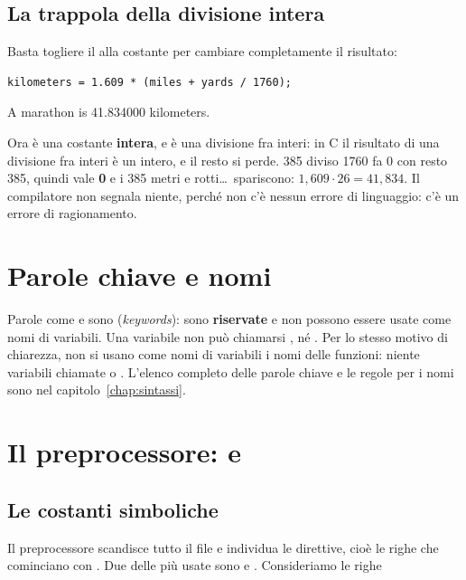 \subsection{La trappola della divisione intera}

Basta togliere il  alla costante per cambiare completamente il
risultato:

\begin{affianco}[0.6][c]
\begin{lstlisting}[style=c]
kilometers = 1.609 * (miles + yards / 1760);
\end{lstlisting}
\risultato
\begin{console}
A marathon is 41.834000 kilometers.
\end{console}
\end{affianco}

Ora  è una costante \textbf{intera}, e  è
una divisione fra interi: in C il risultato di una divisione fra interi è
un intero, e il resto si perde. 385 diviso 1760 fa 0 con resto 385, quindi
 vale \textbf{0} e i 385 metri e rotti\dots\ spariscono:
$1{,}609 \cdot 26 = 41{,}834$. Il compilatore non segnala niente, perché
non c'è nessun errore di linguaggio: c'è un errore di ragionamento.

\section{Parole chiave e nomi}

Parole come  e  sono 
(\textit{keywords}): sono \textbf{riservate} e non possono essere usate come
nomi di variabili. Una variabile non può chiamarsi , né
. Per lo stesso motivo di chiarezza, non si usano come nomi di
variabili i nomi delle funzioni: niente variabili chiamate  o
. L'elenco completo delle parole chiave e le regole per i nomi
sono nel capitolo~\ref{chap:sintassi}.

\section{Il preprocessore:  e }

\subsection{Le costanti simboliche}

Il preprocessore scandisce tutto il file e individua le direttive, cioè le
righe che cominciano con \code{\#}. Due delle più usate sono
 e . Consideriamo le righe


